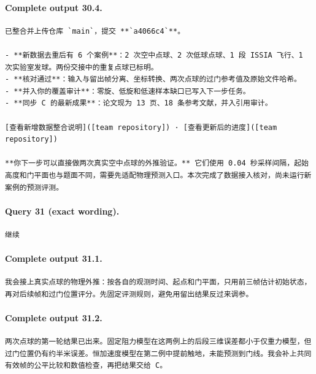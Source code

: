 \documentclass[UTF8,10pt]{ctexart}
\begin{document}
\paragraph{Complete output 30.4.}
\begin{Verbatim}[breaklines=true,breakanywhere=true,fontsize=\scriptsize,frame=single,framesep=2pt]
已整合并上传仓库 `main`，提交 **`a4066c4`**。

- **新数据去重后有 6 个案例**：2 次空中点球、2 次低球点球、1 段 ISSIA 飞行、1 次实验室发球。两份交接中的重复点球已标明。
- **核对通过**：输入与留出帧分离、坐标转换、两次点球的过门参考值及原始文件哈希。
- **并入你的覆盖审计**：零旋、低旋和低速样本缺口已写入下一步任务。
- **同步 C 的最新成果**：论文现为 13 页、18 条参考文献，并入引用审计。

[查看新增数据整合说明]([team repository]) · [查看更新后的进度]([team repository])

**你下一步可以直接做两次真实空中点球的外推验证。** 它们使用 0.04 秒采样间隔，起始高度和门平面也与题面不同，需要先适配物理预测入口。本次完成了数据接入核对，尚未运行新案例的预测评测。
\end{Verbatim}

\paragraph{Query 31 (exact wording).}
\begin{Verbatim}[breaklines=true,breakanywhere=true,fontsize=\scriptsize,frame=single,framesep=2pt]
继续
\end{Verbatim}

\paragraph{Complete output 31.1.}
\begin{Verbatim}[breaklines=true,breakanywhere=true,fontsize=\scriptsize,frame=single,framesep=2pt]
我会接上真实点球的物理外推：按各自的观测时间、起点和门平面，只用前三帧估计初始状态，再对后续帧和过门位置评分。先固定评测规则，避免用留出结果反过来调参。
\end{Verbatim}

\paragraph{Complete output 31.2.}
\begin{Verbatim}[breaklines=true,breakanywhere=true,fontsize=\scriptsize,frame=single,framesep=2pt]
两次点球的第一轮结果已出来。固定阻力模型在这两例上的后段三维误差都小于仅重力模型，但过门位置仍有约半米误差。恒加速度模型在第二例中提前触地，未能预测到门线。我会补上共同有效帧的公平比较和数值检查，再把结果交给 C。
\end{Verbatim}
\end{document}
